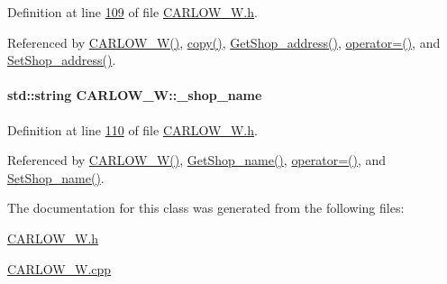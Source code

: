 Definition at line \hyperlink{_c_a_r_l_o_w___w_8h_source_l00109}{109} of file \hyperlink{_c_a_r_l_o_w___w_8h_source}{C\+A\+R\+L\+O\+W\+\_\+\+W.\+h}.



Referenced by \hyperlink{_c_a_r_l_o_w___w_8h_source_l00024}{C\+A\+R\+L\+O\+W\+\_\+\+W()}, \hyperlink{_c_a_r_l_o_w___w_8cpp_source_l00037}{copy()}, \hyperlink{_c_a_r_l_o_w___w_8cpp_source_l00131}{Get\+Shop\+\_\+address()}, \hyperlink{_c_a_r_l_o_w___w_8h_source_l00075}{operator=()}, and \hyperlink{_c_a_r_l_o_w___w_8cpp_source_l00127}{Set\+Shop\+\_\+address()}.

\paragraph[{\texorpdfstring{\+\_\+shop\+\_\+name}{_shop_name}}]{\setlength{\rightskip}{0pt plus 5cm}std\+::string C\+A\+R\+L\+O\+W\+\_\+\+W\+::\+\_\+shop\+\_\+name\hspace{0.3cm}{\ttfamily [private]}}\hypertarget{class_c_a_r_l_o_w___w_ad3ae4ca82f06287d8ad5bec07a43561a_ad3ae4ca82f06287d8ad5bec07a43561a}{}\label{class_c_a_r_l_o_w___w_ad3ae4ca82f06287d8ad5bec07a43561a_ad3ae4ca82f06287d8ad5bec07a43561a}


Definition at line \hyperlink{_c_a_r_l_o_w___w_8h_source_l00110}{110} of file \hyperlink{_c_a_r_l_o_w___w_8h_source}{C\+A\+R\+L\+O\+W\+\_\+\+W.\+h}.



Referenced by \hyperlink{_c_a_r_l_o_w___w_8h_source_l00024}{C\+A\+R\+L\+O\+W\+\_\+\+W()}, \hyperlink{_c_a_r_l_o_w___w_8cpp_source_l00123}{Get\+Shop\+\_\+name()}, \hyperlink{_c_a_r_l_o_w___w_8h_source_l00075}{operator=()}, and \hyperlink{_c_a_r_l_o_w___w_8cpp_source_l00119}{Set\+Shop\+\_\+name()}.



The documentation for this class was generated from the following files\+:\begin{DoxyCompactItemize}
\item 
\hyperlink{_c_a_r_l_o_w___w_8h}{C\+A\+R\+L\+O\+W\+\_\+\+W.\+h}\item 
\hyperlink{_c_a_r_l_o_w___w_8cpp}{C\+A\+R\+L\+O\+W\+\_\+\+W.\+cpp}\end{DoxyCompactItemize}
